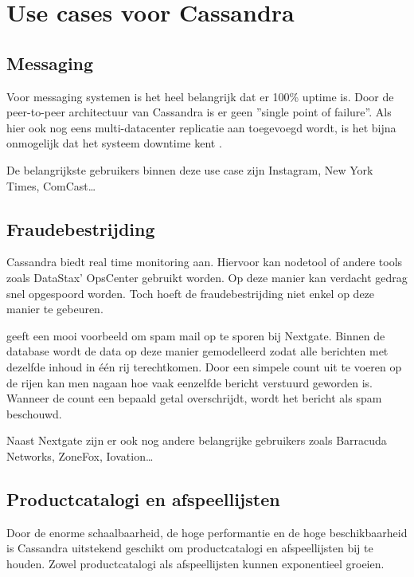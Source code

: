 \chapter{Use cases voor Cassandra}
\label{ch:cassandra_ucs}

\section{Messaging}
Voor messaging systemen is het heel belangrijk dat er 100\% uptime is.
Door de peer-to-peer architectuur van Cassandra is er geen ''single point of failure''.
Als hier ook nog eens multi-datacenter replicatie aan toegevoegd wordt, is het bijna onmogelijk dat het systeem downtime kent \citep{Chan2014Messaging}.

De belangrijkste gebruikers binnen deze use case zijn Instagram, New York Times, ComCast\dots

\section{Fraudebestrijding}
Cassandra biedt real time monitoring aan.
Hiervoor kan nodetool of andere tools zoals DataStax' OpsCenter gebruikt worden.
Op deze manier kan verdacht gedrag snel opgespoord worden.
Toch hoeft de fraudebestrijding niet enkel op deze manier te gebeuren.

\cite{Nguyen2014Fraud} geeft een mooi voorbeeld om spam mail op te sporen bij Nextgate.
Binnen de database wordt de data op deze manier gemodelleerd zodat alle berichten met dezelfde inhoud in één rij terechtkomen.
Door een simpele count uit te voeren op de rijen kan men nagaan hoe vaak eenzelfde bericht verstuurd geworden is.
Wanneer de count een bepaald getal overschrijdt, wordt het bericht als spam beschouwd.

Naast Nextgate zijn er ook nog andere belangrijke gebruikers zoals Barracuda Networks, ZoneFox, Iovation\dots

\section{Productcatalogi en afspeellijsten}
Door de enorme schaalbaarheid, de hoge performantie en de hoge beschikbaarheid is Cassandra uitstekend geschikt om productcatalogi en afspeellijsten bij te houden.
Zowel productcatalogi als afspeellijsten kunnen exponentieel groeien.

